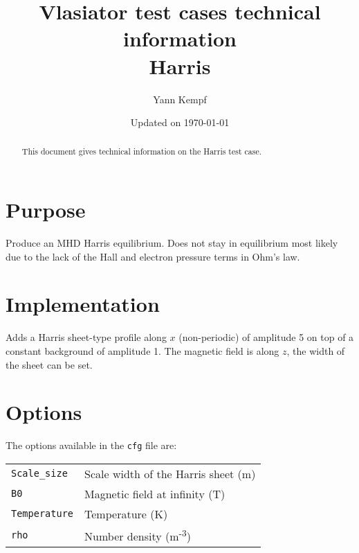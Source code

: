 \documentclass[a4paper,10pt]{scrartcl}
\title{
\Huge{Vlasiator test cases technical information} \\
\LARGE{Harris}
}
\author{Yann Kempf}
\date{Updated on \today}
\begin{document}
\maketitle

\begin{abstract}
   This document gives technical information on the Harris test case.
\end{abstract}

\section{Purpose}
Produce an MHD Harris equilibrium. Does not stay in equilibrium most likely due to the lack of the Hall and electron pressure terms in Ohm's law.


\section{Implementation}
Adds a Harris sheet-type profile along $x$ (non-periodic) of amplitude 5 on top of a constant background of amplitude 1. The magnetic field is along $z$, the width of the sheet can be set.

\section{Options}
The options available in the \verb=cfg= file are:

\begin{tabularx}{\textwidth}{lX}
   \verb=Scale_size= & Scale width of the Harris sheet (m) \\
   \verb=B0= & Magnetic field at infinity (T) \\
   \verb=Temperature= & Temperature (K) \\
   \verb=rho= & Number density (m\textsuperscript{-3})
\end{tabularx}
\end{document}
